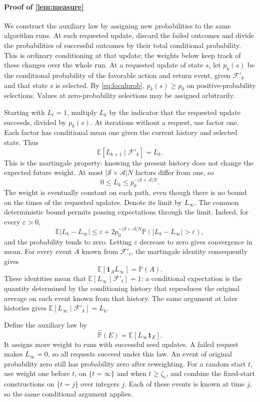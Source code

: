 \paragraph{Proof of \autoref{lem:measure}}
We construct the auxiliary law by assigning new probabilities to the same algorithm runs. At each requested update, discard the failed outcomes and divide the probabilities of successful outcomes by their total conditional probability. This is ordinary conditioning at that update; the weights below keep track of these changes over the whole run.
At a requested update of state $s$, let $p_k(s)$ be the conditional probability of the favorable action and return event, given $\mathcal F'_k$ and that state $s$ is selected. By \eqref{eq:localprob}, $p_k(s)\ge p_0$ on positive-probability selections. Values at zero-probability selections may be assigned arbitrarily.

Starting with $L_t=1$, multiply $L_k$ by the indicator that the requested update succeeds, divided by $p_k(s)$. At iterations without a request, use factor one. Each factor has conditional mean one given the current history and selected state. Thus
\[
\mathbb E[L_{k+1}\mid\mathcal F'_k]=L_k.
\]
This is the martingale property: knowing the present history does not change the expected future weight. At most $|\mathcal S\times\mathcal A|N$ factors differ from one, so
\[
0\le L_k\le p_0^{-|\mathcal S\times\mathcal A|N}.
\]
The weight is eventually constant on each path, even though there is no bound on the times of the requested updates. Denote its limit by $L_\infty$. The common deterministic bound permits passing expectations through the limit. Indeed, for every $\varepsilon>0$,
\[
\mathbb E|L_k-L_\infty|
\le\varepsilon+2p_0^{-|\mathcal S\times\mathcal A|N}
\mathbb P(|L_k-L_\infty|>\varepsilon),
\]
and the probability tends to zero. Letting $\varepsilon$ decrease to zero gives convergence in mean.
For every event $A$ known from $\mathcal F'_t$, the martingale identity consequently gives
\[
\mathbb E[\mathbf1_A L_\infty]=\mathbb P(A).
\]
These identities mean that $\mathbb E[L_\infty\mid\mathcal F'_t]=1$: a conditional expectation is the quantity determined by the conditioning history that reproduces the original average on each event known from that history. The same argument at later histories gives $\mathbb E[L_\infty\mid\mathcal F'_k]=L_k$.

Define the auxiliary law by
\[
\widehat{\mathbb P}(E)=\mathbb E[L_\infty\mathbf1_E].
\]
It assigns more weight to runs with successful seed updates. A failed request makes $L_\infty=0$, so all requests succeed under this law. An event of original probability zero still has probability zero after reweighting.
For a random start $t$, use weight one before $t$, on $\{t=\infty\}$ and when $t\ge\zeta_r$, and combine the fixed-start constructions on $\{t=j\}$ over integers $j$. Each of these events is known at time $j$, so the same conditional argument applies.

